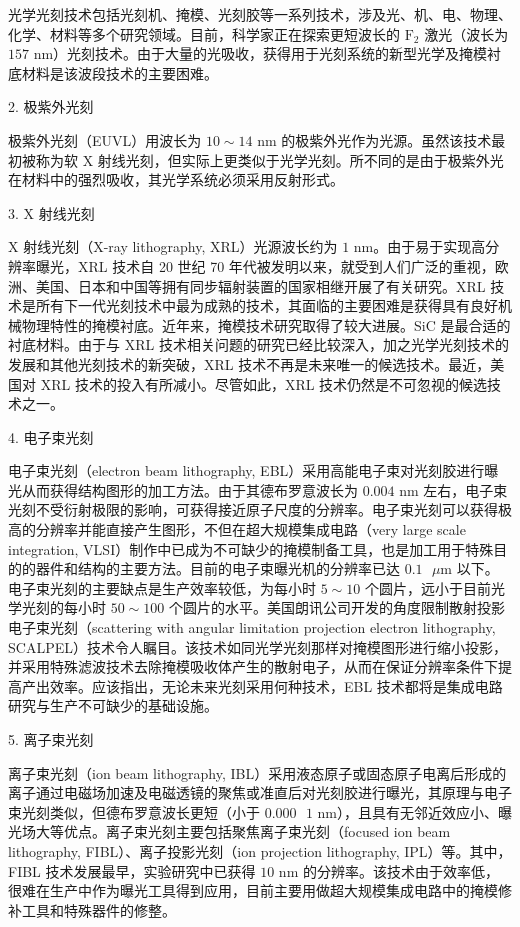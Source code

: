 \documentclass[UTF8]{ctexbook}
\newcommand{\◎}{\ensuremath{\bigcirc}}
\begin{document}
光学光刻技术包括光刻机、掩模、光刻胶等一系列技术，涉及光、机、电、物理、化学、材料等多个研究领域。目前，科学家正在探索更短波长的 $\text{F}_2$ 激光（波长为 $157\text{ nm}$）光刻技术。由于大量的光吸收，获得用于光刻系统的新型光学及掩模衬底材料是该波段技术的主要困难。

2. 极紫外光刻

极紫外光刻（EUVL）用波长为 $10\sim14\text{ nm}$ 的极紫外光作为光源。虽然该技术最初被称为软 X 射线光刻，但实际上更类似于光学光刻。所不同的是由于极紫外光在材料中的强烈吸收，其光学系统必须采用反射形式。

3. X 射线光刻

X 射线光刻（X-ray lithography, XRL）光源波长约为 $1\text{ nm}$。由于易于实现高分辨率曝光，XRL 技术自 20 世纪 70 年代被发明以来，就受到人们广泛的重视，欧洲、美国、日本和中国等拥有同步辐射装置的国家相继开展了有关研究。XRL 技术是所有下一代光刻技术中最为成熟的技术，其面临的主要困难是获得具有良好机械物理特性的掩模衬底。近年来，掩模技术研究取得了较大进展。SiC 是最合适的衬底材料。由于与 XRL 技术相关问题的研究已经比较深入，加之光学光刻技术的发展和其他光刻技术的新突破，XRL 技术不再是未来唯一的候选技术。最近，美国对 XRL 技术的投入有所减小。尽管如此，XRL 技术仍然是不可忽视的候选技术之一。

4. 电子束光刻

电子束光刻（electron beam lithography, EBL）采用高能电子束对光刻胶进行曝光从而获得结构图形的加工方法。由于其德布罗意波长为 $0.004\text{ nm}$ 左右，电子束光刻不受衍射极限的影响，可获得接近原子尺度的分辨率。电子束光刻可以获得极高的分辨率并能直接产生图形，不但在超大规模集成电路（very large scale integration, VLSI）制作中已成为不可缺少的掩模制备工具，也是加工用于特殊目的的器件和结构的主要方法。目前的电子束曝光机的分辨率已达 $0.1\text{ }\mu\text{m}$ 以下。电子束光刻的主要缺点是生产效率较低，为每小时 $5\sim10$ 个圆片，远小于目前光学光刻的每小时 $50\sim100$ 个圆片的水平。美国朗讯公司开发的角度限制散射投影电子束光刻（scattering with angular limitation projection electron lithography, SCALPEL）技术令人瞩目。该技术如同光学光刻那样对掩模图形进行缩小投影，并采用特殊滤波技术去除掩模吸收体产生的散射电子，从而在保证分辨率条件下提高产出效率。应该指出，无论未来光刻采用何种技术，EBL 技术都将是集成电路研究与生产不可缺少的基础设施。

5. 离子束光刻

离子束光刻（ion beam lithography, IBL）采用液态原子或固态原子电离后形成的离子通过电磁场加速及电磁透镜的聚焦或准直后对光刻胶进行曝光，其原理与电子束光刻类似，但德布罗意波长更短（小于 $0.000\text{ }1\text{ nm}$），且具有无邻近效应小、曝光场大等优点。离子束光刻主要包括聚焦离子束光刻（focused ion beam lithography, FIBL）、离子投影光刻（ion projection lithography, IPL）等。其中，FIBL 技术发展最早，实验研究中已获得 $10\text{ nm}$ 的分辨率。该技术由于效率低，很难在生产中作为曝光工具得到应用，目前主要用做超大规模集成电路中的掩模修补工具和特殊器件的修整。
\end{document}

